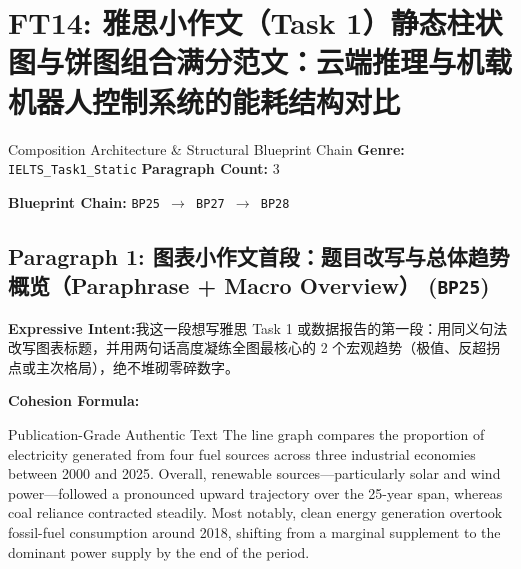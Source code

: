 \section{FT14: 雅思小作文（Task 1）静态柱状图与饼图组合满分范文：云端推理与机载机器人控制系统的能耗结构对比}\label{comp:FT14}
\begin{ConceptBox}{Composition Architecture \& Structural Blueprint Chain}
\textbf{Genre:} \texttt{IELTS\_Task1\_Static} \quad \textbf{Paragraph Count:} 3\par
\textbf{Blueprint Chain:} \texttt{BP25 $\to$ BP27 $\to$ BP28}
\end{ConceptBox}
\subsection*{Paragraph 1: 图表小作文首段：题目改写与总体趋势概览（Paraphrase + Macro Overview） (\texttt{BP25})}
\noindent\textbf{Expressive Intent:}\enspace 我这一段想写雅思 Task 1 或数据报告的第一段：用同义句法改写图表标题，并用两句话高度凝练全图最核心的 2 个宏观趋势（极值、反超拐点或主次格局），绝不堆砌零碎数字。\par
\noindent\textbf{Cohesion Formula:}\par\vspace{4pt}
\begin{ExampleBox}{Publication-Grade Authentic Text}
The line graph compares the proportion of electricity generated from four fuel sources across three industrial economies between 2000 and 2025. Overall, renewable sources---particularly solar and wind power---followed a pronounced upward trajectory over the 25-year span, whereas coal reliance contracted steadily. Most notably, clean energy generation overtook fossil-fuel consumption around 2018, shifting from a marginal supplement to the dominant power supply by the end of the period.
\end{ExampleBox}
